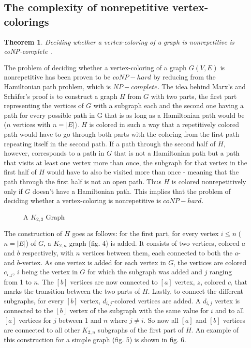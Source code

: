 \documentclass[12pt,a4paper]{article}
\newtheorem{theorem}{Theorem}
\begin{document}
\subsection{The complexity of nonrepetitive vertex-colorings}

\begin{theorem}
Deciding whether a vertex-coloring of a graph is nonrepetitive is coNP-complete \citep{Marx2009}.
\end{theorem}
The problem of deciding whether a vertex-coloring of a graph $G(V, E)$ is nonrepetitive has been proven to be $coNP-hard$ by reducing from the Hamiltonian path problem, which is $NP-complete$. The idea behind Marx's and Schäfer's proof is to construct a graph $H$ from $G$ with two parts, the first part representing the vertices of $G$ with a subgraph each and the second one having a path for every possible path in G that is as long as a Hamiltonian path would be ($n$ vertices with $n = |E|$). $H$ is colored in such a way that a repetitively colored path would have to go through both parts with the coloring from the first path repeating itself in the second path. If a path through the second half of $H$, however, corresponds to a path in $G$ that is not a Hamiltonian path but a path that visits at least one vertex more than once, the subgraph for that vertex in the first half of $H$ would have to also be visited more than once - meaning that the path through the first half is not an open path. Thus $H$ is colored nonrepetitively only if $G$ doesn't have a Hamiltonian path. This implies that the problem of deciding whether a vertex-coloring is nonrepetitive is $coNP-hard$.
\newline
\par
\begin{wrapfigure}[9]{l}{3cm}
	
	\caption{A $K_{2,3}$ Graph}
\end{wrapfigure}
The construction of $H$ goes as follows: for the first part, for every vertex $i \leq n$ ($n = |E|$) of $G$, a $K_{2, n}$ graph (fig. 4) is added. It consists of two vertices, colored $a$ and $b$ respectively, with $n$ vertices between them, each connected to both the $a$- and $b$-vertex. As one vertex is added for each vertex in $G$, the vertices are colored $c_{i,j}$, $i$ being the vertex in $G$ for which the subgraph was added and $j$ ranging from 1 to $n$. The $[b]$ vertices are now connected to $[a]$ vertex, $z$, colored $c$, that marks the transition between the two parts of $H$. Lastly, to connect the different subgraphs, for every $[b]$ vertex, $d_{i,j}$-colored vertices are added. A $d_{i, j}$ vertex is connected to the $[b]$ vertex of the subgraph with the same value for $i$ and to all $[a]$ vertices for $j$ between 1 and $n$ where $j \neq i$.  So now all $[a]$ and $[b]$ vertices are connected to all other $K_{2,n}$ subgraphs of the first part of $H$. An example of this construction for a simple graph (fig. 5) is shown in fig. 6.
\end{document}
